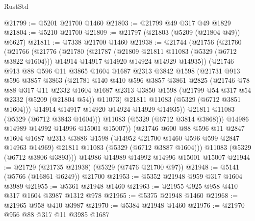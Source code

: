 \begin{lexlean}{RustStd}
\begin{coremodule}
@21799 := @5201 @21700 @1460
@21803 := @21799 @49 @317 @49 @1829
@21804 := @5210 @21700
@21809 := @21797 (@21803 (@5209 (@21804 @49)) @6627)
@21811 := @7338 @21700 @1460
@21938 := @21744
    (@21756
      (@21760
        (@21766
          (@21776
            (@21780
              (@21787
                (@21809 @21811 @11083 (@5329 (@6712 @3822 @1604)))
                @14914
                @14917
                @14920
                @14924
                @14929
                @14935))
            (@21746
              @913
              @88
              @596
              @11
              @3865
              @1604
              @1687
              @2313
              @3842
              @1598
              (@21731
                @913
                @596
                @3857
                @3863
                (@21781
                  @140
                  @410
                  @596
                  @3857
                  @3861
                  @2825
                  (@21746
                    @78
                    @88
                    @317
                    @11
                    @2332
                    @1604
                    @1687
                    @2313
                    @3850
                    @1598
                    (@21799 @54 @317 @54 @2332 (@5209 (@21804 @54)) @11073)
                    @21811
                    @11083
                    (@5329 (@6712 @3851 @1604)))
                  @14914
                  @14917
                  @14920
                  @14924
                  @14929
                  @14935))
              @21811
              @11083
              (@5329 (@6712 @3843 @1604)))
            @11083
            (@5329 (@6712 @3814 @3868)))
          @14986
          @14989
          @14992
          @14996
          @15001
          @15007))
      (@21746
        @600
        @88
        @596
        @11
        @2847
        @1604
        @1687
        @2313
        @3886
        @1598
        (@14952 @21700 @1460 @596 @599 @2847 @14963 @14969)
        @21811
        @11083
        (@5329 (@6712 @3887 @1604)))
      @11083
      (@5329 (@6712 @3806 @3893)))
    @14986
    @14989
    @14992
    @14996
    @15001
    @15007
@21944 := @21729 (@21735 @21938) (@5329 (@7476 @21700 @97))
@21948 := @5141 (@5766 (@16861 @6249)) @21700
@21953 := @5352 @21948 @959 @317 @1604 @3989
@21955 := @5361 @21948 @1460
@21963 := @21955 @925 @958 @410 @317 @1604 @3987 @1312 @978
@21965 := @5375 @21948 @1460
@21968 := @21965 @958 @410 @3987
@21970 := @5384 @21948 @1460
@21976 := @21970 @956 @88 @317 @11 @3985 @1687

\end{coremodule}
\end{lexlean}
